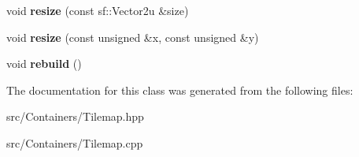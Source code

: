 \begin{DoxyCompactItemize}
\item 
\mbox{\label{class_dolly_1_1_containers_1_1_tilemap_a85ba534d528a122e76daa79a236b6ca9}} 
void {\bfseries resize} (const sf\+::\+Vector2u \&size)
\item 
\mbox{\label{class_dolly_1_1_containers_1_1_tilemap_a175379e9d3c7b6c9e8275c93638719f2}} 
void {\bfseries resize} (const unsigned \&x, const unsigned \&y)
\item 
\mbox{\label{class_dolly_1_1_containers_1_1_tilemap_a9e7921cd647c256d6e41d888f38c0c08}} 
void {\bfseries rebuild} ()
\end{DoxyCompactItemize}


The documentation for this class was generated from the following files\+:\begin{DoxyCompactItemize}
\item 
src/\+Containers/Tilemap.\+hpp\item 
src/\+Containers/Tilemap.\+cpp\end{DoxyCompactItemize}
